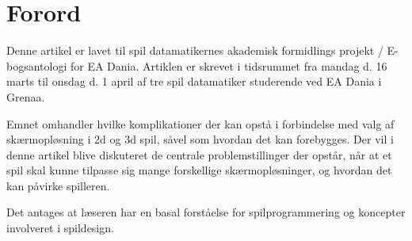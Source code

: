 	
	

\chapter*{Forord}
Denne artikel er lavet til spil datamatikernes akademisk formidlings projekt / E-bogsantologi for EA Dania. Artiklen er skrevet i tidsrummet fra mandag d. 16 marts til onsdag d. 1 april af tre spil datamatiker studerende ved EA Dania i Grenaa.

Emnet omhandler hvilke komplikationer der kan opstå i forbindelse med valg af skærmopløsning i 2d og 3d spil, såvel som hvordan det kan forebygges. Der vil i denne artikel blive diskuteret de centrale problemstillinger der opstår, når at et spil skal kunne tilpasse sig mange forskellige skærmopløsninger, og hvordan det kan påvirke spilleren. 

Det antages at læseren har en basal forståelse for spilprogrammering og koncepter involveret i spildesign.


	\newpage
		\pagestyle{fancy}
		\lhead{} \chead{} \rhead{} \lfoot{} \cfoot{} \rfoot{} 	
	
	\tableofcontents
	
	
	\newpage	
	\pagestyle{fancy}
		\lhead{}
		\renewcommand{\headrulewidth}{0.4pt}
		\renewcommand{\footrulewidth}{0.4pt}
	
	\setcounter{page}{1}	
		
		
		
		\clearpage	
		
		

		\clearpage	
	
		
		
		\clearpage		
			
		
		
		\clearpage
		
	\printbibliography


